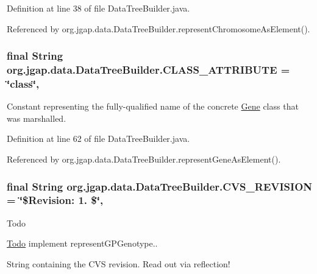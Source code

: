 Definition at line 38 of file Data\-Tree\-Builder.\-java.



Referenced by org.\-jgap.\-data.\-Data\-Tree\-Builder.\-represent\-Chromosome\-As\-Element().

\hypertarget{classorg_1_1jgap_1_1data_1_1_data_tree_builder_a2bba03d3ed93657ca4c8ea500d1d3158}{
\subsubsection[{C\-L\-A\-S\-S\-\_\-\-A\-T\-T\-R\-I\-B\-U\-T\-E}]{\setlength{\rightskip}{0pt plus 5cm}final String org.\-jgap.\-data.\-Data\-Tree\-Builder.\-C\-L\-A\-S\-S\-\_\-\-A\-T\-T\-R\-I\-B\-U\-T\-E = \char`\"{}class\char`\"{}\hspace{0.3cm}{\ttfamily [static]}, {\ttfamily [private]}}}\label{classorg_1_1jgap_1_1data_1_1_data_tree_builder_a2bba03d3ed93657ca4c8ea500d1d3158}
Constant representing the fully-\/qualified name of the concrete \hyperlink{interfaceorg_1_1jgap_1_1_gene}{Gene} class that was marshalled. 

Definition at line 62 of file Data\-Tree\-Builder.\-java.



Referenced by org.\-jgap.\-data.\-Data\-Tree\-Builder.\-represent\-Gene\-As\-Element().

\hypertarget{classorg_1_1jgap_1_1data_1_1_data_tree_builder_a6a849e086eb4968ee222f54c88fde434}{
\subsubsection[{C\-V\-S\-\_\-\-R\-E\-V\-I\-S\-I\-O\-N}]{\setlength{\rightskip}{0pt plus 5cm}final String org.\-jgap.\-data.\-Data\-Tree\-Builder.\-C\-V\-S\-\_\-\-R\-E\-V\-I\-S\-I\-O\-N = \char`\"{}\$Revision\-: 1. \$\char`\"{}\hspace{0.3cm}{\ttfamily [static]}, {\ttfamily [private]}}}\label{classorg_1_1jgap_1_1data_1_1_data_tree_builder_a6a849e086eb4968ee222f54c88fde434}
\begin{DoxyRefDesc}{Todo}
\item[\hyperlink{todo__todo000054}{Todo}]implement represent\-G\-P\-Genotype.. \end{DoxyRefDesc}
String containing the C\-V\-S revision. Read out via reflection! 

